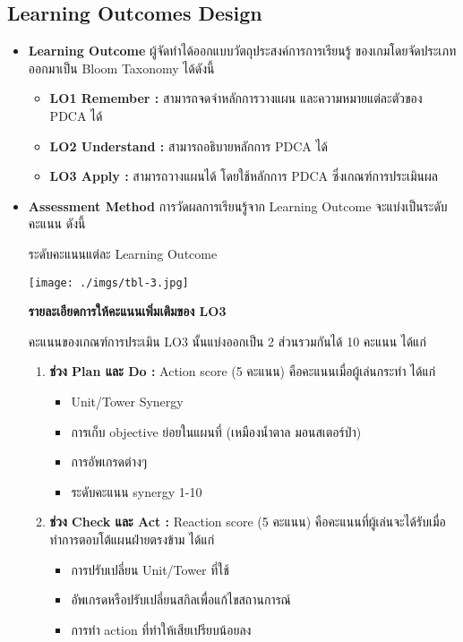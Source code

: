 \documentclass[12pt,oneside,openright,a4paper]{cpe-thai-project}
\begin{document}
\subsection{Learning Outcomes Design}
\begin{itemize}
  \item \textbf{Learning Outcome} ผู้จัดทำได้ออกแบบวัตถุประสงค์การการเรียนรู้
  ของเกมโดยจัดประเภทออกมาเป็น Bloom Taxonomy ได้ดังนี้

  \begin{itemize}
    \item \textbf{LO1 Remember :} สามารถจดจำหลักการวางแผน
    และความหมายแต่ละตัวของ PDCA ได้
    \item \textbf{LO2 Understand :} สามารถอธิบายหลักการ PDCA ได้
    \item \textbf{LO3 Apply :} สามารถวางแผนได้ โดยใช้หลักการ PDCA
    ซึ่งเกณฑ์การประเมินผล
  \end{itemize}

  \item \textbf{Assessment Method} การวัดผลการเรียนรู้จาก 
  Learning Outcome จะแบ่งเป็นระดับคะแนน ดังนี้

  \begin{table}[H]
    \caption{ระดับคะแนนแต่ละ Learning Outcome}\label{tbl:tab-3}
    \centering
    \texttt{[image: ./imgs/tbl-3.jpg]}
  \end{table}

  \textbf{รายละเอียดการให้คะแนนเพิ่มเติมของ LO3}

  คะแนนของเกณฑ์การประเมิน LO3 นั้นแบ่งออกเป็น 2 ส่วนรวมกันได้ 10 คะแนน ได้แก่

  \begin{enumerate}
    \item \textbf{ช่วง Plan และ Do :} Action score (5 คะแนน) 
    คือคะแนนเมื่อผู้เล่นกระทำ ได้แก่ 

    \begin{itemize}
      \item Unit/Tower Synergy 
      \item การเก็บ objective ย่อยในแผนที่ (เหมืองน้ำตาล มอนสเตอร์ป่า) 
      \item การอัพเกรดต่างๆ
      \item ระดับคะแนน synergy 1-10
    \end{itemize}

    \item \textbf{ช่วง Check และ Act :} Reaction score (5 คะแนน) 
    คือคะแนนที่ผู้เล่นจะได้รับเมื่อทำการตอบโต้แผนฝ่ายตรงข้าม ได้แก่

    \begin{itemize}
      \item การปรับเปลี่ยน Unit/Tower ที่ใช้
      \item อัพเกรดหรือปรับเปลี่ยนสกิลเพื่อแก้ไขสถานการณ์
      \item การทำ action ที่ทำให้เสียเปรียบน้อยลง
    \end{itemize}

  \end{enumerate}

\end{itemize}
\end{document}

